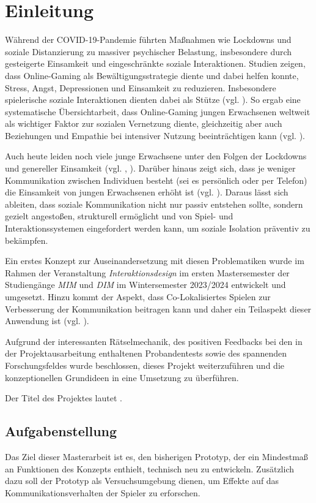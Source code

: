\chapter{Einleitung}
Während der COVID-19-Pandemie führten Maßnahmen wie Lockdowns und soziale Distanzierung zu massiver psychischer Belastung, insbesondere durch gesteigerte Einsamkeit und eingeschränkte soziale Interaktionen. Studien zeigen, dass Online-Gaming als Bewältigungsstrategie diente und dabei helfen konnte, Stress, Angst, Depressionen und Einsamkeit zu reduzieren. Insbesondere spielerische soziale Interaktionen dienten dabei als Stütze (vgl. \citealp{lewinson_gaming_2023}). So ergab eine systematische Übersichtarbeit, dass Online-Gaming jungen Erwachsenen weltweit als wichtiger Faktor zur sozialen Vernetzung diente, gleichzeitig aber auch Beziehungen und Empathie bei intensiver Nutzung beeinträchtigen kann (vgl. \citealp{park_global_2025}). 

Auch heute leiden noch viele junge Erwachsene unter den Folgen der Lockdowns und genereller Einsamkeit (vgl. \citealp{peer_junge_2024}, \citealp{noauthor_einsamkeitsreport_2024}). Darüber hinaus zeigt sich, dass je weniger Kommunikation zwischen Individuen besteht (sei es persönlich oder per Telefon) die Einsamkeit von jungen Erwachsenen erhöht ist (vgl. \citealp[S. 3]{sakurai_who_2021}). Daraus lässt sich ableiten, dass soziale Kommunikation nicht nur passiv entstehen sollte, sondern gezielt angestoßen, strukturell ermöglicht und von Spiel- und Interaktionssystemen eingefordert werden kann, um soziale Isolation präventiv zu bekämpfen. 

Ein erstes Konzept zur Auseinandersetzung mit diesen Problematiken wurde im Rahmen der Veranstaltung \emph{Interaktionsdesign} im ersten Mastersemester der Studiengänge\emph{ \ac{MIM}} und \emph{\ac{DIM}} im Wintersemester 2023/2024 entwickelt und umgesetzt. Hinzu kommt der Aspekt, dass Co-Lokalisiertes Spielen zur Verbesserung der Kommunikation beitragen kann und daher ein Teilaspekt dieser Anwendung ist (vgl. \citealp[S. 9]{goddard_designing_2016}).

Aufgrund der interessanten Rätselmechanik, des positiven Feedbacks bei den in der Projektausarbeitung enthaltenen Probandentests sowie des spannenden Forschungsfeldes wurde beschlossen, dieses Projekt weiterzuführen und die konzeptionellen Grundideen in eine Umsetzung zu überführen.

Der Titel des Projektes lautet .

\section{Aufgabenstellung}
Das Ziel dieser Masterarbeit ist es, den bisherigen Prototyp, der ein Mindestmaß an Funktionen des Konzepts enthielt, technisch neu zu entwickeln. Zusätzlich dazu soll der Prototyp als Versuchsumgebung dienen, um Effekte auf das Kommunikationsverhalten der Spieler zu erforschen. 


